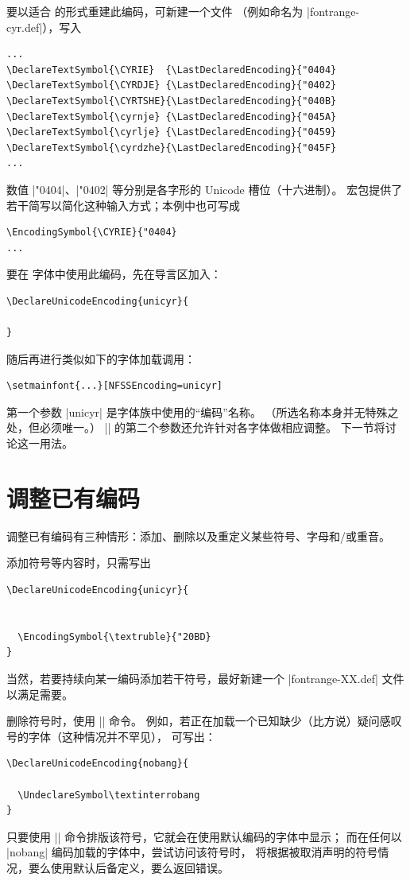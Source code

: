 \documentclass[a4paper]{l3doc}
\begin{document}
要以适合  的形式重建此编码，可新建一个文件
（例如命名为 |fontrange-cyr.def|），写入
\begin{Verbatim}
...
\DeclareTextSymbol{\CYRIE}  {\LastDeclaredEncoding}{"0404}
\DeclareTextSymbol{\CYRDJE} {\LastDeclaredEncoding}{"0402}
\DeclareTextSymbol{\CYRTSHE}{\LastDeclaredEncoding}{"040B}
\DeclareTextSymbol{\cyrnje} {\LastDeclaredEncoding}{"045A}
\DeclareTextSymbol{\cyrlje} {\LastDeclaredEncoding}{"0459}
\DeclareTextSymbol{\cyrdzhe}{\LastDeclaredEncoding}{"045F}
...
\end{Verbatim}
数值 |"0404|、|"0402| 等分别是各字形的 Unicode 槽位（十六进制）。
 宏包提供了若干简写以简化这种输入方式；本例中也可写成
\begin{Verbatim}
\EncodingSymbol{\CYRIE}{"0404}
...
\end{Verbatim}

要在  字体中使用此编码，先在导言区加入：
\begin{Verbatim}
\DeclareUnicodeEncoding{unicyr}{
  
}
\end{Verbatim}
随后再进行类似如下的字体加载调用：
\begin{Verbatim}
\setmainfont{...}[NFSSEncoding=unicyr]
\end{Verbatim}
第一个参数 |unicyr| 是字体族中使用的“编码”名称。
（所选名称本身并无特殊之处，但必须唯一。）
|\DeclareUnicodeEncoding| 的第二个参数还允许针对各字体做相应调整。
下一节将讨论这一用法。


\section{调整已有编码}

调整已有编码有三种情形：添加、删除以及重定义某些符号、字母和/或重音。

添加符号等内容时，只需写出
\begin{Verbatim}
\DeclareUnicodeEncoding{unicyr}{
  
  
  \EncodingSymbol{\textruble}{"20BD}
}
\end{Verbatim}
当然，若要持续向某一编码添加若干符号，最好新建一个 |fontrange-XX.def| 文件
以满足需要。

删除符号时，使用 |\UndeclareSymbol| 命令。
例如，若正在加载一个已知缺少（比方说）疑问感叹号的字体（这种情况并不罕见），
可写出：
\begin{Verbatim}
\DeclareUnicodeEncoding{nobang}{
  
  \UndeclareSymbol\textinterrobang
}
\end{Verbatim}
只要使用 |\textinterrobang| 命令排版该符号，它就会在使用默认编码的字体中显示；
而在任何以 |nobang| 编码加载的字体中，尝试访问该符号时，
将根据被取消声明的符号情况，要么使用默认后备定义，要么返回错误。
\end{document}
